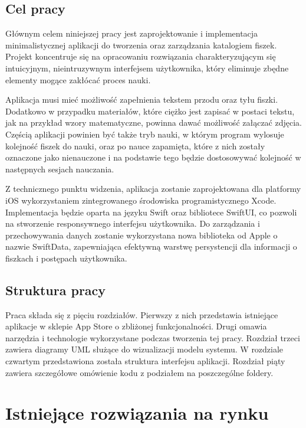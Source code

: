 \documentclass[final,a4paper,openany,12pt]{mwbk}
\begin{document}
\newpage
\section*{Cel pracy}

Głównym celem niniejszej pracy jest zaprojektowanie i implementacja minimalistycznej aplikacji do tworzenia oraz zarządzania katalogiem fiszek. Projekt koncentruje się na opracowaniu rozwiązania charakteryzującym się intuicyjnym, nieintruzywnym interfejsem użytkownika, który eliminuje zbędne elementy mogące zakłócać proces nauki. 

Aplikacja musi mieć możliwość zapełnienia tekstem przodu oraz tyłu fiszki. Dodatkowo w przypadku materiałów, które ciężko jest zapisać w postaci tekstu, jak na przykład wzory matematyczne, powinna dawać możliwość załączać zdjęcia. Częścią aplikacji powinien być także tryb nauki, w którym program wylosuje kolejność fiszek do nauki, oraz po nauce zapamięta, które z nich zostały oznaczone jako nienauczone i na podstawie tego będzie dostosowywać kolejność w następnych sesjach nauczania.

Z technicznego punktu widzenia, aplikacja zostanie zaprojektowana dla platformy iOS wykorzystaniem zintegrowanego środowiska programistycznego Xcode. Implementacja będzie oparta na języku Swift oraz bibliotece SwiftUI, co pozwoli na stworzenie responsywnego interfejsu użytkownika. Do zarządzania i przechowywania danych zostanie wykorzystana nowa biblioteka od Apple o nazwie SwiftData, zapewniająca efektywną warstwę persystencji dla informacji o fiszkach i postępach użytkownika.

\section*{Struktura pracy}

Praca składa się z pięciu rozdziałów. Pierwszy z nich przedstawia istniejące aplikacje w sklepie App Store o zbliżonej funkcjonalności. Drugi omawia narzędzia i technologie wykorzystane podczas tworzenia tej pracy. Rozdział trzeci zawiera diagramy UML służące do wizualizacji modelu systemu. W rozdziale czwartym przedstawiona została struktura interfejsu aplikacji. Rozdział piąty zawiera szczegółowe omówienie kodu z podziałem na poszczególne foldery.

\chapter{Istniejące rozwiązania na rynku}
\end{document}
